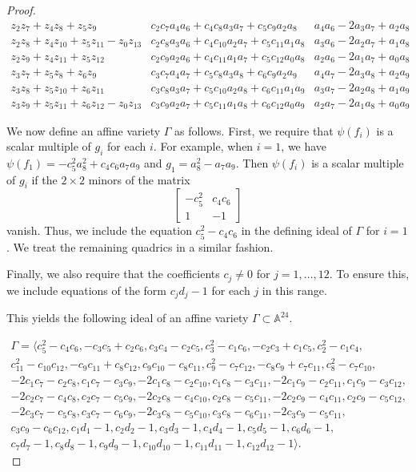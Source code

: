 \documentclass{amsart}[12pt]
\theoremstyle{definition}
\numberwithin{equation}{section}
\newcommand{\AffX}{\Gamma}
\begin{document}
\begin{proof}
\[\begin{array}{lll}
z_2 z_7+z_4 z_8+z_5 z_9    &    c_2 c_7 a_4 a_6+c_4 c_8 a_3 a_7+c_5 c_9 a_2 a_8    &    a_4 a_6-2 a_3 a_7+a_2 a_8\\
z_2 z_8+z_4 z_10+z_5 z_11-z_0 z_13    &    c_2 c_8 a_3 a_6+c_4 c_{10} a_2 a_7+c_5 c_{11} a_1 a_8    &    a_3 a_6-2 a_2 a_7+a_1 a_8\\
z_2 z_9+z_4 z_11+z_5 z_12    &    c_2 c_9 a_2 a_6+c_4 c_{11} a_1 a_7+c_5 c_{12} a_0 a_8    &    a_2 a_6-2 a_1 a_7+a_0 a_8\\
z_3 z_7+z_5 z_8+z_6 z_9    &    c_3 c_7 a_4 a_7+c_5 c_8 a_3 a_8+c_6 c_9 a_2 a_9    &    a_4 a_7-2 a_3 a_8+a_2 a_9\\
z_3 z_8+z_5 z_10+z_6 z_11    &    c_3 c_8 a_3 a_7+c_5 c_{10} a_2 a_8+c_6 c_{11} a_1 a_9    &    a_3 a_7-2 a_2 a_8+a_1 a_9\\
z_3 z_9+z_5 z_11+z_6 z_12-z_0 z_13    &    c_3 c_9 a_2 a_7+c_5 c_{11} a_1 a_8+c_6 c_{12} a_0 a_9    &    a_2 a_7-2 a_1 a_8+a_0 a_9
\end{array}
\]



We now define an affine variety $\AffX$ as follows. First, we require that
$\psi(f_i)$ is a scalar multiple of $g_i$ for each $i$. For
example, when $i=1$, we have $\psi(f_1) =-c_5^2 a_8^2+c_4 c_6 a_7 a_9 $ and $g_1 = a_8^2-a_7 a_9$. Then 
$\psi(f_i)$ is a scalar multiple of $g_i$ if the $2 \times 2$
minors of the matrix
\[
 \left[ \begin{array}{cc}
    -c_5^2 & c_4 c_6 \\
    1 & -1
  \end{array} \right]
\]
vanish. Thus, we include the equation $c_5^2-c_4c_6$ in the defining ideal of $\AffX$ for
$i=1$. We treat the remaining quadrics in a similar fashion. 

Finally, we also require that the coefficients $c_j \neq 0$ for
$j=1,\ldots, 12$. To ensure this, we include equations of the form
$c_j d_j -1$ for each $j$ in this range. 

This yields the following ideal of an affine variety $\AffX \subset \mathbb{A}^{24}$.

\begin{gather*}
  \AffX = \langle c_5^2-c_4 c_6, -c_3 c_5+c_2 c_6, c_3 c_4-c_2 c_5, c_3^2-c_1 c_6, -c_2 c_3+c_1 c_5, c_2^2-c_1 c_4,\\
c_{11}^2-c_{10} c_{12}, -c_9 c_{11}+c_8 c_{12}, c_9 c_{10}-c_8 c_{11}, c_9^2-c_7 c_{12}, -c_8 c_9+c_7 c_{11}, c_8^2-c_7 c_{10},\\
-2 c_1 c_7-c_2 c_8, c_1 c_7-c_3 c_9, -2 c_1 c_8-c_2 c_{10}, c_1 c_8-c_3 c_{11}, -2 c_1 c_9-c_2 c_{11}, c_1 c_9-c_3 c_{12},\\
-2 c_2 c_7-c_4 c_8, c_2 c_7-c_5 c_9, -2 c_2 c_8-c_4 c_{10}, c_2 c_8-c_5 c_{11}, -2 c_2 c_9-c_4 c_{11}, c_2 c_9-c_5 c_{12},\\
-2 c_3 c_7-c_5 c_8, c_3 c_7-c_6 c_9, -2 c_3 c_8-c_5 c_{10}, c_3 c_8-c_6 c_{11}, -2 c_3 c_9-c_5 c_{11},  \\
c_3 c_9-c_6 c_{12},c_1 d_1-1,c_2 d_2-1,c_3 d_3-1,c_4 d_4-1,c_5 d_5-1,c_6 d_6-1,\\
c_7 d_7 -1, c_8 d_8 -1, c_9 d_9 -1, c_{10} d_{10} -1, c_{11} d_{11} -1, c_{12} d_{12} -1\rangle.
\end{gather*}



\end{proof}
\end{document}

